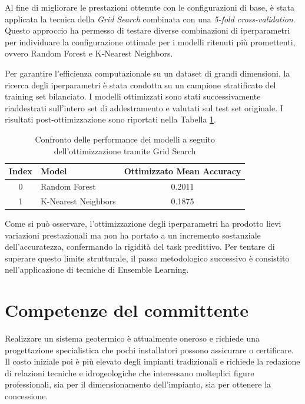 Al fine di migliorare le prestazioni ottenute con le configurazioni di base, è stata applicata la tecnica della \textit{Grid Search} combinata con una \textit{5-fold cross-validation}. Questo approccio ha permesso di testare diverse combinazioni di iperparametri per individuare la configurazione ottimale per i modelli ritenuti più promettenti, ovvero Random Forest e K-Nearest Neighbors. 

Per garantire l'efficienza computazionale su un dataset di grandi dimensioni, la ricerca degli iperparametri è stata condotta su un campione stratificato del training set bilanciato. I modelli ottimizzati sono stati successivamente riaddestrati sull'intero set di addestramento e valutati sul test set originale. I risultati post-ottimizzazione sono riportati nella Tabella \ref{tab:modelli_ottimizzati}.

\begin{table}[H]
    \centering
    \begin{tabular}{|c|l|c|}
    \hline
    \textbf{Index} & \textbf{Model} & \textbf{Ottimizzato Mean Accuracy} \\ \hline
    0 & Random Forest & 0.2011 \\ \hline
    1 & K-Nearest Neighbors & 0.1875 \\ \hline
    \end{tabular}
    \caption{Confronto delle performance dei modelli a seguito dell'ottimizzazione tramite Grid Search}
    \label{tab:modelli_ottimizzati}
\end{table}

Come si può osservare, l'ottimizzazione degli iperparametri ha prodotto lievi variazioni prestazionali ma non ha portato a un incremento sostanziale dell'accuratezza, confermando la rigidità del task predittivo. Per tentare di superare questo limite strutturale, il passo metodologico successivo è consistito nell'applicazione di tecniche di Ensemble Learning.

\section{Competenze del committente}
Realizzare un sistema geotermico è attualmente oneroso e richiede una progettazione specialistica che pochi installatori possono assicurare o certificare. Il costo iniziale poi è più elevato degli impianti tradizionali e richiede la redazione di relazioni tecniche e idrogeologiche che interessano molteplici figure professionali, sia per il dimensionamento dell'impianto, sia per ottenere la concessione.

